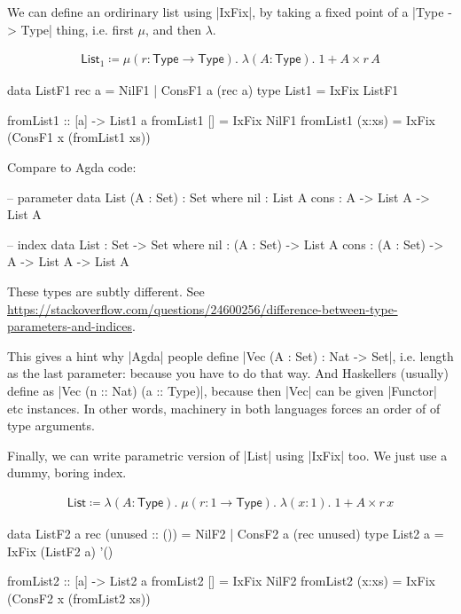 We can define an ordirinary list using |IxFix|,
by taking a fixed point of a |Type -> Type| thing,
i.e. first $\mu$, and then $\lambda$.

\begin{align*}
  \mathsf{List}_1 \coloneqq \mu (r : \mathsf{Type} \to \mathsf{Type}).\; \lambda (A : \mathsf{Type}).\; 1 + A \times r\,A
\end{align*}

\begin{code}
data ListF1 rec a = NilF1 | ConsF1 a (rec a)
type List1 = IxFix ListF1

fromList1 :: [a] -> List1 a
fromList1 []     = IxFix NilF1
fromList1 (x:xs) = IxFix (ConsF1 x (fromList1 xs))
\end{code}

Compare to Agda code:

\begin{code}
-- parameter
data List (A : Set) : Set where
    nil  : List A
    cons : A -> List A -> List A

-- index
data List : Set -> Set where
    nil :  (A : Set) -> List A
    cons : (A : Set) -> A -> List A -> List A
\end{code}

These types are subtly different.
See \url{https://stackoverflow.com/questions/24600256/difference-between-type-parameters-and-indices}.

This gives a hint why |Agda| people define |Vec (A : Set) : Nat -> Set|,
i.e. length as the last parameter: because you have to do that way.
And Haskellers (usually) define as |Vec (n :: Nat) (a :: Type)|,
because then |Vec| can be given |Functor| etc instances.
In other words, machinery in both languages forces an order of
of type arguments.

Finally, we can write parametric version of |List| using
|IxFix| too. We just use a dummy, boring index.

\begin{align*}
  \mathsf{List} \coloneqq
  \lambda (A : \mathsf{Type}).\;
  \mu (r : 1 \to \mathsf{Type}).\;
  \lambda (x : 1).\;
  1 + A \times r\,x
\end{align*}

\begin{code}
data ListF2 a rec (unused :: ()) = NilF2 | ConsF2 a (rec unused)
type List2 a = IxFix (ListF2 a) '()

fromList2 :: [a] -> List2 a
fromList2 []     = IxFix NilF2
fromList2 (x:xs) = IxFix (ConsF2 x (fromList2 xs))
\end{code}

